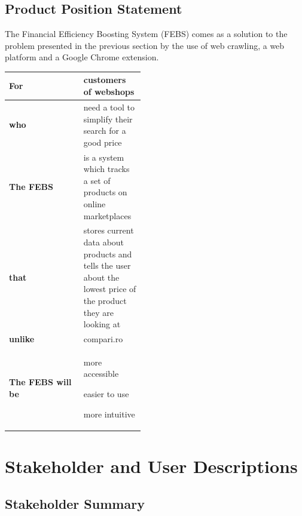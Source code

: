 \documentclass[12pt,a4paper,twoside]{report}
\begin{document}
\subsection{Product Position Statement}

The Financial Efficiency Boosting System (FEBS) comes as a solution to the problem presented in the previous section by the use of web crawling, a web platform and a Google Chrome extension.

\begin{table}[H]
  \centering
  \begin{tabular}{| g | m{0.45\linewidth} |}
    \hline
    \textbf{For}              & customers of webshops                                                                                           \\
    \hline
    \textbf{who}              & need a tool to simplify their search for a good price                                                           \\
    \hline
    \textbf{The FEBS}         & is a system which tracks a set of products on online marketplaces                                               \\
    \hline
    \textbf{that}             & stores current data about products and tells the user about the lowest price of the product they are looking at \\
    \hline
    \textbf{unlike}           & compari.ro                                                                                                      \\
    \hline
    \textbf{The FEBS will be} &
    more accessible

    easier to use

    more intuitive                                                                                                                              \\
    \hline
  \end{tabular}
  \label{table:product_position_statement}
\end{table}


\section{Stakeholder and User Descriptions}
\subsection{Stakeholder Summary}
\end{document}
